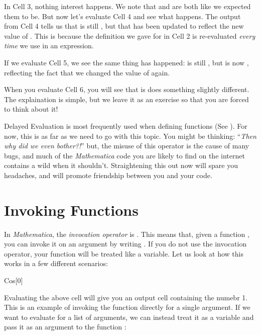 In Cell 3, nothing interest happens. We note that  and  are both  like we expected them to be. But now let's evaluate Cell 4 and see what happens. The output from Cell 4 tells us that  is still , but that  has been updated to reflect the new value of . This is because the definition we gave for  in Cell 2 is re-evaluated \emph{every time} we use  in an expression.

If we evaluate Cell 5, we see the same thing has happened:  is still , but  is now , reflecting the fact that we changed the value of  again.

When you evaluate Cell 6, you will see that is does something slightly different. The explaination is simple, but we leave it as an exercise so that you are forced to think about it!

Delayed Evaluation is most frequently used when defining functions (See ). For now, this is as far as we need to go with this topic. You might be thinking: ``\emph{Then why did we even bother?!}'' but, the misuse of this operator is the cause of many bugs, and much of the \emph{Mathematica} code you are likely to find on the internet contains a wild \expr{:=} when it shouldn't. Straightening this out now will spare you headaches, and will promote friendship between you and your code.

\section{Invoking Functions}

In \emph{Mathematica}, the \emph{invocation operator} is \expr{[]}. This means that, given a function , you can invoke it on an argument  by writing . If you do not use the invocation operator, your function will be treated like a variable. Let us look at how this works in a few different scenarios:

\begin{code}
	   Cos[0]
\end{code}

Evaluating the above cell will give you an output cell containing the numebr 1. This is an example of invoking the  function directly for a single argument. If we want to evaluate  for a list of arguments, we can instead treat it as a variable and pass it as an argument to the function :

